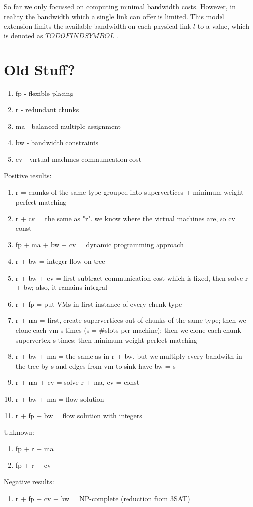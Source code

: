 So far we only focussed on computing minimal bandwidth costs. However, in reality the bandwidth which a single link can offer is limited. This model extension limits the available bandwidth on each physical link $l$ to a value, which is denoted as $TODO FIND SYMBOL$ .


\section{Old Stuff?}

\begin{enumerate}
\item fp - flexible placing
\item r - redundant chunks
\item ma - balanced multiple assignment
\item bw - bandwidth constraints
\item cv - virtual machines communication cost
\end{enumerate}

Positive results:

\begin{enumerate}
\item r = chunks of the same type grouped into supervertices + minimum weight perfect matching
\item r + cv = the same as "r", we know where the virtual machines are, so cv = const
\item fp + ma + bw + cv = dynamic programming approach
\item r + bw = integer flow on tree
\item r + bw + cv = first subtract communication cost which is fixed, then solve r + bw; also, it remains integral
\item r + fp = put VMs in first instance of every chunk type
\item r + ma = first, create supervertices out of chunks of the same type; then we clone each vm s times (s = \#slots per machine); then we clone each chunk supervertex s times; then minimum weight perfect matching
\item r + bw + ma = the same as in r + bw, but we multiply every bandwith in the tree by s and edges from vm to sink have bw = s
\item r + ma + cv = solve r + ma, cv = const
\item r + bw + ma = flow solution
\item r + fp + bw = flow solution with integers
\end{enumerate}

Unknown:

\begin{enumerate}
\item fp + r + ma
\item fp + r + cv
\end{enumerate}

Negative results:

\begin{enumerate}
\item r + fp + cv + bw = NP-complete (reduction from 3SAT)
\end{enumerate}